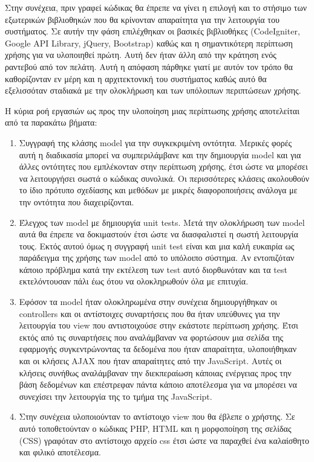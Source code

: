 Στην συνέχεια, πριν γραφεί κώδικας θα έπρεπε να γίνει η επιλογή και το στήσιμο των εξωτερικών βιβλιοθηκών που θα κρίνονταν απαραίτητα για την λειτουργία του συστήματος. Σε αυτήν την φάση επιλέχθηκαν οι βασικές βιβλιοθήκες (CodeIgniter, Google API Library, jQuery, Bootstrap) καθώς και η σημαντικότερη περίπτωση χρήσης για να υλοποιηθεί πρώτη. Αυτή δεν ήταν άλλη από την κράτηση ενός ραντεβού από τον πελάτη. Αυτή η απόφαση πάρθηκε γιατί με αυτόν τον τρόπο θα καθορίζονταν εν μέρη και η αρχιτεκτονική του συστήματος καθώς αυτό θα εξελισσόταν σταδιακά με την ολοκλήρωση και των υπόλοιπων περιπτώσεων χρήσης.

Η κύρια ροή εργασιών ως προς την υλοποίηση μιας περίπτωσης χρήσης αποτελείται από τα παρακάτω βήματα:
\begin{enumerate}
\item Συγγραφή της κλάσης model για την συγκεκριμένη οντότητα. Μερικές φορές αυτή η διαδικασία μπορεί να συμπεριλάμβανε και την δημιουργία model και για άλλες οντότητες που εμπλέκονταν στην περίπτωση χρήσης, έτσι ώστε να μπορέσει να λειτουργήσει σωστά ο κώδικας συνολικά. Οι περισσότερες κλάσεις ακολουθούν το ίδιο πρότυπο σχεδίασης και μεθόδων με μικρές διαφοροποιήσεις ανάλογα με την οντότητα που διαχειρίζονται. 
\item Έλεγχος των model με δημιουργία unit tests. Μετά την ολοκλήρωση των model αυτά θα έπρεπε να δοκιμαστούν έτσι ώστε να διασφαλιστεί η σωστή λειτουργία τους. Εκτός αυτού όμως η συγγραφή unit test είναι και μια καλή ευκαιρία ως παράδειγμα της χρήσης των model από το υπόλοιπο σύστημα. Αν εντοπιζόταν κάποιο πρόβλημα κατά την εκτέλεση των test αυτό διορθωνόταν και τα test εκτελόντουσαν πάλι έως ότου να ολοκληρωθούν όλα με επιτυχία.
\item Εφόσον τα model ήταν ολοκληρωμένα στην συνέχεια δημιουργήθηκαν οι controllers και οι αντίστοιχες συναρτήσεις που θα ήταν υπεύθυνες για την λειτουργία του view που αντιστοιχούσε στην εκάστοτε περίπτωση χρήσης. Έτσι εκτός από τις συναρτήσεις που αναλάμβαναν να φορτώσουν μια σελίδα της εφαρμογής συγκεντρώνοντας τα δεδομένα που ήταν απαραίτητα, υλοποιήθηκαν και οι κλήσεις AJAX που ήταν απαραίτητες από την JavaScript. Αυτές οι κλήσεις συνήθως αναλάμβαναν την διεκπεραίωση κάποιας ενέργειας προς την βάση δεδομένων και επέστρεφαν πάντα κάποιο αποτέλεσμα για να μπορέσει να συνεχίσει την λειτουργία της το τμήμα της JavaScript.
\item Στην συνέχεια υλοποιούνταν το αντίστοιχο view που θα έβλεπε ο χρήστης. Σε αυτό τοποθετούνταν ο κώδικας PHP, HTML και η μορφοποίηση της σελίδας (CSS) γραφόταν στο αντίστοιχο αρχείο css έτσι ώστε να παραχθεί ένα καλαίσθητο και φιλικό αποτέλεσμα.

\end{enumerate}
